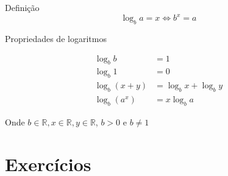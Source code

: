 \documentclass[a4paper]{article}
\begin{document}
Definição
\begin{displaymath}
  \log_b a = x \Leftrightarrow b^x = a
\end{displaymath}

Propriedades de logaritmos

\begin{eqnarray*}
  \log_b b &= 1\\
  \log_b 1 &= 0\\
  \log_b (x+y) &= \log_b x + \log_b y\\
  \log_b (a^x) &= x \log_b a
\end{eqnarray*}

Onde $b\in \mathbb{R}, x\in \mathbb{R}, y\in \mathbb{R}$, $b>0$ e $b
\ne 1$


\section{Exercícios}
\end{document}
